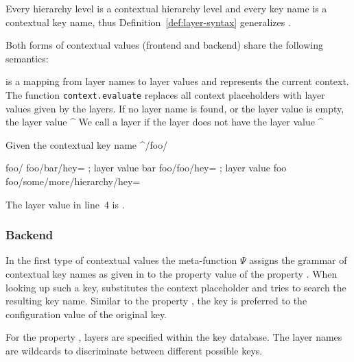 Every hierarchy level is a contextual hierarchy level and every key name is a contextual key name, thus Definition~\ref{def:layer-syntax} generalizes .

Both forms of contextual values (frontend and backend) share the following semantics:
\begin{definition}
\label{def:context-evaluate}
 is a mapping from layer names to layer values and represents the current context.
The function \texttt{context.evaluate} replaces all context placeholders with layer values given by the layers.
If no layer name is found, or the layer value is empty, the layer value ^%
We call a layer  if the layer does not have the layer value ^%
\end{definition}

\begin{example}
\label{ex:contextual-key-name}
Given the contextual key name ^/foo/%

\begin{code}[language=CfgElektra]
foo/%
foo/bar/hey=   ; layer value bar
foo/foo/hey=   ; layer value foo
foo/some/more/hierarchy/hey=
\end{code}

The layer value in line~4 is .
\end{example}



\subsubsection{Backend}
\label{sec:approach-context-property}

In the first type of contextual values the meta-function $\Psi$ assigns the grammar of contextual key names as given in  to the property value of the property .
When looking up such a key,  substitutes the context placeholder and tries to search the resulting key name.
Similar to the property , the key is preferred to the configuration value of the original key.

For the property , layers are specified within the key database.
The layer names are wildcards to discriminate between different possible keys.

